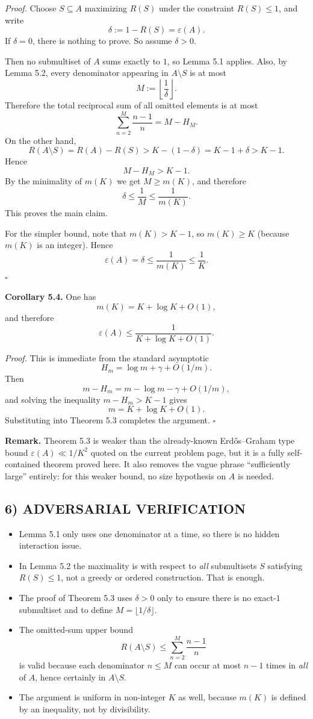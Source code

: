 \emph{Proof.}
Choose $S\subseteq A$ maximizing $R(S)$ under the constraint $R(S)\le 1$, and write
\[
\delta:=1-R(S)=\varepsilon(A).
\]
If $\delta=0$, there is nothing to prove. So assume $\delta>0$.

Then no submultiset of $A$ sums exactly to $1$, so Lemma 5.1 applies. Also, by Lemma 5.2, every denominator appearing in $A\setminus S$ is at most
\[
M:=\left\lfloor \frac1\delta\right\rfloor.
\]
Therefore the total reciprocal sum of all omitted elements is at most
\[
\sum_{n=2}^{M}\frac{n-1}{n}=M-H_M.
\]
On the other hand,
\[
R(A\setminus S)=R(A)-R(S)>K-(1-\delta)=K-1+\delta>K-1.
\]
Hence
\[
M-H_M > K-1.
\]
By the minimality of $m(K)$ we get $M\ge m(K)$, and therefore
\[
\delta\le \frac1M\le \frac{1}{m(K)}.
\]
This proves the main claim.

For the simpler bound, note that $m(K)>K-1$, so $m(K)\ge K$ (because $m(K)$ is an integer). Hence
\[
\varepsilon(A)=\delta\le \frac{1}{m(K)}\le \frac1K.
\]
\hfill $\square$

\medskip
\textbf{Corollary 5.4.}
One has
\[
m(K)=K+\log K+O(1),
\]
and therefore
\[
\varepsilon(A)\le \frac{1}{K+\log K+O(1)}.
\]

\emph{Proof.}
This is immediate from the standard asymptotic
\[
H_m=\log m+\gamma+O(1/m).
\]
Then
\[
m-H_m = m-\log m-\gamma+O(1/m),
\]
and solving the inequality $m-H_m>K-1$ gives
\[
m=K+\log K+O(1).
\]
Substituting into Theorem 5.3 completes the argument. \hfill $\square$

\medskip
\textbf{Remark.}
Theorem 5.3 is weaker than the already-known Erd\H{o}s--Graham type bound $\varepsilon(A)\ll 1/K^2$ quoted on the current problem page, but it is a fully self-contained theorem proved here. It also removes the vague phrase ``sufficiently large'' entirely: for this weaker bound, no size hypothesis on $A$ is needed.

\subsection*{6) ADVERSARIAL VERIFICATION}
\begin{itemize}
\item Lemma 5.1 only uses one denominator at a time, so there is no hidden interaction issue.
\item In Lemma 5.2 the maximality is with respect to \emph{all} submultisets $S$ satisfying $R(S)\le 1$, not a greedy or ordered construction. That is enough.
\item The proof of Theorem 5.3 uses $\delta>0$ only to ensure there is no exact-$1$ submultiset and to define $M=\lfloor 1/\delta\rfloor$.
\item The omitted-sum upper bound
\[
R(A\setminus S)\le \sum_{n=2}^M \frac{n-1}{n}
\]
is valid because each denominator $n\le M$ can occur at most $n-1$ times in \emph{all} of $A$, hence certainly in $A\setminus S$.
\item The argument is uniform in non-integer $K$ as well, because $m(K)$ is defined by an inequality, not by divisibility.
\end{itemize}

